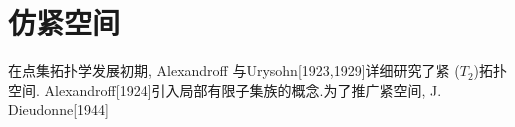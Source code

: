 \documentclass[main.tex]{subfiles}
\begin{document}
\section{仿紧空间}\label{ch2.3}
在点集拓扑学发展初期, Alexandroff 与Urysohn[1923,1929]详细研究了紧
($T_2$)拓扑空间. Alexandroff[1924]引入局部有限子集族的概念.为了推广紧空间, J. Dieudonne[1944]
	
\end{document}
